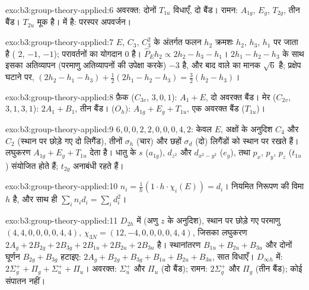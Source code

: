 \begin{solution}{exo:b3:group-theory-applied:6}
अवरक्त: दोनों $T_{1u}$ विधाएँ, दो बैंड। रामन: $A_{1g}$, $E_g$, $T_{2g}$, तीन बैंड।
$T_{2u}$ मूक है।  में  है: परस्पर अपवर्जन।
\end{solution}

\begin{solution}{exo:b3:group-theory-applied:7}
$E$, $C_3$, $C_3^2$ के अंतर्गत फलन $h_2$ क्रमशः $h_2$, $h_3$, $h_1$ पर जाता है ( 2,
$-1$, $-1$); परावर्तनों का योगदान 0 है। $\hat P_Eh_2 \propto 2h_2 - h_3 - h_1$।
$2h_1 - h_2 - h_3$ के साथ इसका अतिव्यापन (परमाणु अतिव्यापनों की उपेक्षा करके) $-3$ है, और
बाद वाले का मानक $\sqrt6$ है; प्रक्षेप घटाने पर, $(2h_2 - h_1 - h_3) +
\frac12(2h_1 - h_2 - h_3) = \frac32(h_2 - h_3)$।
\end{solution}

\begin{solution}{exo:b3:group-theory-applied:8}
फ़ैक ($C_{3v}$,  $3, 0, 1$): $A_1 + E$, दो अवरक्त बैंड। मेर ($C_{2v}$,
 $3, 1, 3, 1$): $2A_1 + B_1$, तीन बैंड।  ($O_h$): $A_{1g} + E_g
+ T_{1u}$, एक अवरक्त बैंड ($T_{1u}$)।
\end{solution}

\begin{solution}{exo:b3:group-theory-applied:9}
 $6, 0, 0, 2, 2, 0, 0, 0, 4, 2$: केवल $E$, अक्षों के अनुदिश $C_4$ और $C_2$
(स्थान पर छोड़े गए दो लिगैंड), तीनों $\sigma_h$ (चार) और छहों $\sigma_d$
(दो) लिगैंडों को स्थान पर रखते हैं। लघुकरण $A_{1g} + E_g + T_{1u}$ देता है। धातु के $s$
($a_{1g}$), $d_{z^2}$ और $d_{x^2-y^2}$ ($e_g$), तथा $p_x$, $p_y$, $p_z$ ($t_{1u}$) संयोजित होते हैं;
$t_{2g}$ अनाबंधी रहते हैं।
\end{solution}

\begin{solution}{exo:b3:group-theory-applied:10}
$n_i = \frac1h(1\cdot h\cdot\chi_i(E)) = d_i$। नियमित
निरूपण की विमा $h$ है, और साथ ही $\sum_in_id_i = \sum_id_i^2$।
\end{solution}

\begin{solution}{exo:b3:group-theory-applied:11}
$D_{2h}$ में (अणु $z$ के अनुदिश), स्थान पर छोड़े गए परमाणु $(4, 4, 0, 0, 0, 0, 4, 4)$, $\chi_{3N}
= (12, -4, 0, 0, 0, 0, 4, 4)$, जिसका लघुकरण $2A_g + 2B_{2g} + 2B_{3g} + 2B_{1u} + 2B_{2u}
+ 2B_{3u}$ है। स्थानांतरण $B_{1u} + B_{2u} + B_{3u}$ और दोनों घूर्णन
$B_{2g} + B_{3g}$ हटाइए: $2A_g + B_{2g} + B_{3g} + B_{1u} + B_{2u} + B_{3u}$, सात विधाएँ।
$D_{\infty h}$ में: $2\Sigma_g^+ + \Pi_g + \Sigma_u^+ + \Pi_u$। अवरक्त: $\Sigma_u^+$ और $\Pi_u$
(दो बैंड); रामन: $2\Sigma_g^+$ और $\Pi_g$ (तीन बैंड); कोई संपातन नहीं।
\end{solution}

